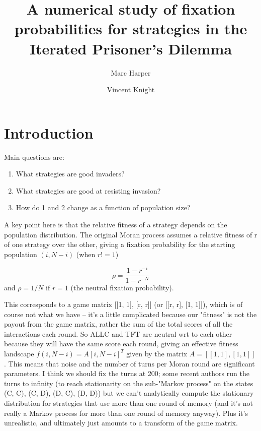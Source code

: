 \documentclass{article}
\title{A numerical study of fixation probabilities for strategies in the
       Iterated Prisoner's Dilemma}
\author{Marc Harper \and Vincent Knight}
\date{}
\begin{document}
\maketitle


\section{Introduction}\label{sec:introduction}

Main questions are:

\begin{enumerate}
    \item What strategies are good invaders?
    \item What strategies are good at resisting invasion?
    \item How do 1 and 2 change as a function of population size?
\end{enumerate}

A key point here is that the relative fitness of a strategy depends on the
population distribution. The original Moran process assumes a relative fitness
of r of one strategy over the other, giving a fixation probability for the
starting population $(i, N-i)$ (when $r != 1$)

\[ \rho = \frac{1 - r^{-i}}{1 - r^{-N}}\]
and $\rho = 1 / N$ if $r=1$ (the neutral fixation probability).

This corresponds to a game matrix [[1, 1], [r, r]] (or [[r, r], [1, 1]]), which
is of course not what we have -- it's a little complicated because our "fitness"
is not the payout from the game matrix, rather the sum of the total scores of
all the interactions each round. So ALLC and TFT are neutral wrt to each other
because they will have the same score each round, giving an effective fitness
landscape $f(i, N-i) = A [i, N-i]^T$ given by the matrix $A = [[1,1],[1,1]]$.
This means that noise and the number of turns per Moran round are significant
parameters. I think we should fix the turns at 200; some recent authors run the
turns to infinity (to reach stationarity on the sub-"Markov process" on the
states (C, C), (C, D), (D, C), (D, D)) but we can't analytically compute the
stationary distribution for strategies that use more than one round of memory
(and it's not really a Markov process for more than one round of memory anyway).
Plus it's unrealistic, and ultimately just amounts to a transform of the game
matrix.
\end{document}
